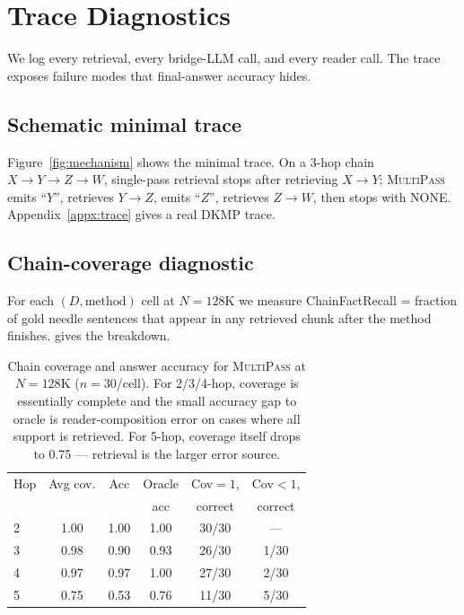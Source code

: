 \documentclass{article}
\theoremstyle{plain}
\theoremstyle{definition}
\newcommand{\ours}{\textsc{MultiPass}}
\begin{document}
\section{Trace Diagnostics}\label{sec:trace}

We log every retrieval, every bridge-LLM call, and every reader call. The
trace exposes failure modes that final-answer accuracy hides.

\subsection{Schematic minimal trace}

Figure~\ref{fig:mechanism} shows the minimal trace. On a 3-hop chain
$X{\to}Y{\to}Z{\to}W$, single-pass retrieval stops after retrieving
$X{\to}Y$; \ours{} emits ``$Y$'', retrieves $Y{\to}Z$, emits ``$Z$'',
retrieves $Z{\to}W$, then stops with NONE. Appendix~\ref{appx:trace}
gives a real DKMP trace.

\subsection{Chain-coverage diagnostic}

For each $(D,\text{method})$ cell at $N{=}128$K we measure
ChainFactRecall = fraction of gold needle sentences that appear in any
retrieved chunk after the method finishes.  gives the
breakdown.

\begin{table}[t]
\centering
\caption{Chain coverage and answer accuracy for \ours{} at $N{=}128$K
($n{=}30$/cell). For 2/3/4-hop, coverage is essentially complete and the
small accuracy gap to oracle is reader-composition error on cases where
all support is retrieved. For 5-hop, coverage itself drops to 0.75 ---
retrieval is the larger error source.}
\label{tab:coverage}
\small
\begin{tabular}{@{}lccccc@{}}
\toprule
Hop & Avg cov. & Acc & Oracle & Cov$=1$, & Cov$<1$, \\
& & & acc & correct & correct \\
\midrule
2 & 1.00 & 1.00 & 1.00 & 30/30 & --- \\
3 & 0.98 & 0.90 & 0.93 & 26/30 & 1/30 \\
4 & 0.97 & 0.97 & 1.00 & 27/30 & 2/30 \\
5 & 0.75 & 0.53 & 0.76 & 11/30 & 5/30 \\
\bottomrule
\end{tabular}
\end{table}
\end{document}
